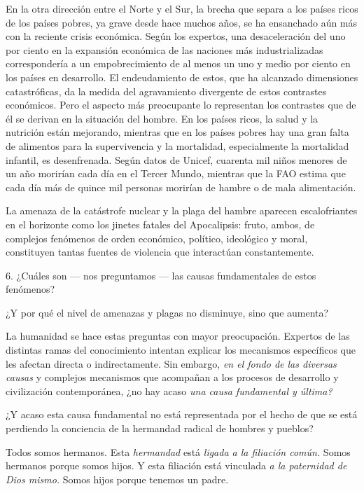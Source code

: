 \begin{body}
	En la otra dirección entre el Norte y el Sur, la brecha que separa a los países ricos de los países pobres, ya grave desde hace muchos años, se ha ensanchado aún más con la reciente crisis económica. Según los expertos, una desaceleración del uno por ciento en la expansión económica de las naciones más industrializadas correspondería a un empobrecimiento de al menos un uno y medio por ciento en los países en desarrollo. El endeudamiento de estos, que ha alcanzado dimensiones catastróficas, da la medida del agravamiento divergente de estos contrastes económicos. Pero el aspecto más preocupante lo representan los contrastes que de él se derivan en la situación del hombre. En los países ricos, la salud y la nutrición están mejorando, mientras que en los países pobres hay una gran falta de alimentos para la supervivencia y la mortalidad, especialmente la mortalidad infantil, es desenfrenada. Según datos de Unicef, cuarenta mil niños menores de un año morirían cada día en el Tercer Mundo, mientras que la FAO estima que cada día más de quince mil personas morirían de hambre o de mala alimentación.

	La amenaza de la catástrofe nuclear y la plaga del hambre aparecen escalofriantes en el horizonte como los jinetes fatales del Apocalipsis: fruto, ambos, de complejos fenómenos de orden económico, político, ideológico y moral, constituyen tantas fuentes de violencia que interactúan constantemente.

	6. ¿Cuáles son --- nos preguntamos --- las causas fundamentales de estos fenómenos?

	¿Y por qué el nivel de amenazas y plagas no disminuye, sino que aumenta?

	La humanidad se hace estas preguntas con mayor preocupación. Expertos de las distintas ramas del conocimiento intentan explicar los mecanismos específicos que les afectan directa o indirectamente. Sin embargo, \emph{en el fondo de las diversas causas} y complejos mecanismos que acompañan a los procesos de desarrollo y civilización contemporánea, ¿no hay acaso \emph{una causa fundamental y última?}

	¿Y acaso esta causa fundamental no está representada por el hecho de que se está perdiendo la conciencia de la hermandad radical de hombres y pueblos?

	Todos somos hermanos. Esta \emph{hermandad} está \emph{ligada a la 	filiación común.} Somos hermanos porque somos hijos. Y esta filiación está vinculada \emph{a la paternidad de Dios mismo.} Somos hijos porque tenemos un padre.


\end{body}
